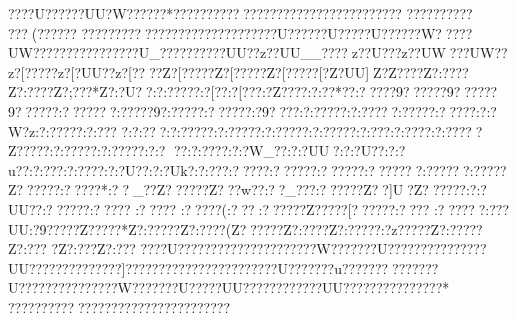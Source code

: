 {{{{{{{{{{{{{{{{{{{{{{{{{{{{{{{{{{{{{{{{{{{{{{{{{{{{{{{{{{{{{{{{{{{{{{{{{{{{{{{{{{{{{{{{{{{{{{{{{{{{{{{{{{{{{{{{{{{{{{{{{{{{{{{{{{{{{{{{{{{{{{{{{{{{{{{{{{{{{{{{{{{{{{{{{{{{{{{{{{{{{{{{{{{{{{{{{{{{{{{{{{{{{{{{{{{{{{{{{{{{{{{{{{{{{{{{{{{{{{{{{{{{{{{{{{{{{{{{{{{{{{{{{{{{{{{{{{{{{{{{{{{{{{{{{{{{{{{{{{{{{{{{{{{{{{{{{{{{{{{{{{{{{{{{{{{{{{{{{{{{{{{{{{{{{{{{{{{{{{{{{{{{{{{{{{{{{{{{{{{{{{{{{{{{{{{{{{{{{{{{{{{{{{{{{{{{{{{{{{{{{{{{{{{{{{{{{{{{{{{{{{{{{{{{{{{{{{{{{{{{{{{{{{{{{{{{{{{{{{{{{{{{{{{{{{{{{{{{{{{{{{{{{{{{{{{{{{{{{{{{{{{{{{{{{{{{{{{{{{{{{{{{{{{{{{{{{{ ????U}??????UU?W??{????*??{???? ??{?? ??{???????{???????{?????{???
 ??{???? ??{??
 ??{?(?????? 
??{???? ??{??????{???????{?????{???U???{???U}??{???U?????{?W????{?UW? ??{?????{???????{?U_??{?{?????{?{?UU??z?{?UU__{?{??? z?{?U???z?{?UW?{?{?UW??z?[?????z?[?UU??z?[????Z?[?????Z?[?????Z?[?????[?Z?UU]Z?Z???? Z?:???? Z?:????Z?;???* Z?:?U??:?:?????:?[??  :?[???  :?Z???? :?:??*??:??? ??9??????9??????9??????:???????:?????9?:?????:??????:?9????:?:?????:?:?????:?????:?????:?:?W?z:?:?????:?:???
?:?:?? ?:?:?????:?:?????:?:?????:?:?????:?:???:?:? ???:?:?????Z?????:?:?????:?:?????:?:?
??:?:????:?:?W_??:?:?UU?:?:?U??:?:?u}??:?:?  ??:?:? ???:?:?U??:?:?Uk{?:?:???:?????:??????:??????:???????:??????:?????Z??????:?????*:??_??Z??????Z???w??:??_???:??????Z??]U?Z??????:?:?UU??:??????:?????
:?????
:?????(:???:??????Z?????[??????:????
 :????? ?:???UU:?9?????Z?????* Z?:?????Z?:????(Z??????Z?:???? Z?:?????:?z?????Z?:?????Z?:??? ?Z?:???  Z?:???  ????U?????????????????????W???????U???????????????UU??????????????]???????????????????????U???????u??????????????U???????????????W???????U}?????UU??????  ??????UU????{???  ??{???  ??{?*
  ??{???  ??{??? ??{???? ??{???? ??{?????{????
}}}}}}}}}}}}}}}}}}}}}}}}}}}}}}}}}}}}}}}}}}}}}}}}}}}}}}}}}}}}}}}}}}}}}}}}}}}}}}}}}}}}}}}}}}}}}}}}}}}}}}}}}}}}}}}}}}}}}}}}}}}}}}}}}}}}}}}}}}}}}}}}}}}}}}}}}}}}}}}}}}}}}}}}}}}}}}}}}}}}}}}}}}}}}}}}}}}}}}}}}}}}}}}}}}}}}}}}}}}}}}}}}}}}}}}}}}}}}}}}}}}}}}}}}}}}}}}}}}}}}}}}}}}}}}}}}}}}}}}}}}}}}}}}}}}}}}}}}}}}}}}}}}}}}}}}}}}}}}}}}}}}}}}}}}}}}}}}}}}}}}}}}}}}}}}}}}}}}}}}}}}}}}}}}}}}}}}}}}}}}}}}}}}}}}}}}}}}}}}}}}}}}}}}}}}}}}}}}}}}}}}}}}}}}}}}}}}}}}}}}}}}}}}}}}}}}}}}}}}}}}}}}}}}}}}}}}}}}}}}}}}}}}}}}}}}}}}}}}}}}}}}}}}}}}}}}}}}}}}}}}}}}}}}}}}}}}}}}}}}}}}}}}}}}}}}}}}}}}}}}}}}}}}}}}}}}}}}}}}}}}}}}}}}}}}}}
